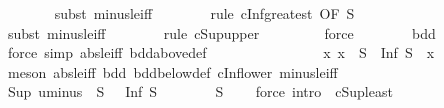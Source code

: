 \begin{isabellebody}
\ \ \ \ \ \ \isamarkupfalse%
\ {\isacharparenleft}{\kern0pt}subst\ minus{\isacharunderscore}{\kern0pt}le{\isacharunderscore}{\kern0pt}iff{\isacharparenright}{\kern0pt}\isanewline
\ \ \ \ \ \ \isamarkupfalse%
\ {\isacharparenleft}{\kern0pt}rule\ cInf{\isacharunderscore}{\kern0pt}greatest\ {\isacharbrackleft}{\kern0pt}OF\ {\isacartoucheopen}S\ {\isasymnoteq}\ {\isacharbraceleft}{\kern0pt}{\isacharbraceright}{\kern0pt}{\isacartoucheclose}{\isacharbrackright}{\kern0pt}{\isacharparenright}{\kern0pt}\isanewline
\ \ \ \ \ \ \isamarkupfalse%
\ {\isacharparenleft}{\kern0pt}subst\ minus{\isacharunderscore}{\kern0pt}le{\isacharunderscore}{\kern0pt}iff{\isacharparenright}{\kern0pt}\isanewline
\ \ \ \ \ \ \isamarkupfalse%
\ {\isacharparenleft}{\kern0pt}rule\ cSup{\isacharunderscore}{\kern0pt}upper{\isacharparenright}{\kern0pt}\isanewline
\ \ \ \ \ \ \ \isamarkupfalse%
\ force\isanewline
\ \ \ \ \ \ \isamarkupfalse%
\ bdd\isanewline
\ \ \ \ \ \ \isamarkupfalse%
\ {\isacharparenleft}{\kern0pt}force\ simp{\isacharcolon}{\kern0pt}\ abs{\isacharunderscore}{\kern0pt}le{\isacharunderscore}{\kern0pt}iff\ bdd{\isacharunderscore}{\kern0pt}above{\isacharunderscore}{\kern0pt}def{\isacharparenright}{\kern0pt}\isanewline
\ \ \ \ \ \ \isamarkupfalse%
\isanewline
\ \ \isamarkupfalse%
\isanewline
\ \ \ \ \isamarkupfalse%
\ {\isacharasterisk}{\kern0pt}{\isacharcolon}{\kern0pt}\ {\isachardoublequoteopen}{\isasymAnd}x{\isachardot}{\kern0pt}\ x\ {\isasymin}\ S\ {\isasymLongrightarrow}\ Inf\ S\ {\isasymle}\ x{\isachardoublequoteclose}\isanewline
\ \ \ \ \ \ \isamarkupfalse%
\ {\isacharparenleft}{\kern0pt}meson\ abs{\isacharunderscore}{\kern0pt}le{\isacharunderscore}{\kern0pt}iff\ bdd\ bdd{\isacharunderscore}{\kern0pt}below{\isacharunderscore}{\kern0pt}def\ cInf{\isacharunderscore}{\kern0pt}lower\ minus{\isacharunderscore}{\kern0pt}le{\isacharunderscore}{\kern0pt}iff{\isacharparenright}{\kern0pt}\isanewline
\ \ \ \ \isamarkupfalse%
\ {\isachardoublequoteopen}Sup\ {\isacharparenleft}{\kern0pt}uminus\ {\isacharbackquote}{\kern0pt}\ S{\isacharparenright}{\kern0pt}\ {\isasymle}\ {\isacharminus}{\kern0pt}\ Inf\ S{\isachardoublequoteclose}\isanewline
\ \ \ \ \ \ \isamarkupfalse%
\ {\isacartoucheopen}S\ {\isasymnoteq}\ {\isacharbraceleft}{\kern0pt}{\isacharbraceright}{\kern0pt}{\isacartoucheclose}\ \isamarkupfalse%
\ {\isacharparenleft}{\kern0pt}force\ intro{\isacharcolon}{\kern0pt}\ {\isacharasterisk}{\kern0pt}\ cSup{\isacharunderscore}{\kern0pt}least{\isacharparenright}{\kern0pt}\isanewline

\end{isabellebody}
